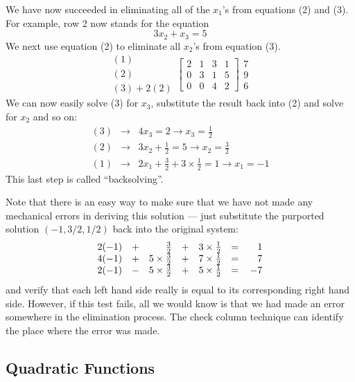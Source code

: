 \begin{example}
We have now succeeded in eliminating all of the $x_1$'s from equations
(2) and (3). For example, row 2 now stands for the equation
\[
3x_2+x_3=5
\]
We next use equation (2) to eliminate all $x_2$'s from equation
(3).
\[
\begin{array}{c} (1) \\ (2) \\ (3)+2(2) \end{array} 
\left[ \begin{array}{ccc|c} 2&1&3 & 1 \\  0&3&1&5 \\  0& 0&4 & 2 \end{array} \right]
\begin{array}{c} 7 \\ 9 \\ 6 \end{array} 
\]
We can now easily solve (3) for $x_3$, substitute the result back into (2) and
solve for $x_2$ and so on:
\begin{eqnarray*}
(3) &\rightarrow & 4x_3 =2  \rightarrow x_3 = \frac{1}{2} \\
(2) &\rightarrow & 3x_2 +\frac{1}{2} =5  \rightarrow x_2 = \frac{3}{2} \\
(1) &\rightarrow & 2x_1 + \frac{3}{2} + 3 \times \frac{1}{2} =1  \rightarrow x_1 = -1
\end{eqnarray*}
This last step is called ``backsolving''.
\end{example} 

Note that there is an easy way to make sure that we have not made any mechanical
errors in deriving this solution --- just substitute the purported solution
$(-1,3/2,1/2)$ back into the original system:
\[
\begin{array}{rrrrrrr}
  2(-1)&+& \frac{3}{2} &+&3 \times \frac{1}{2} &=\,&1 \\
  4(-1)&+&5\times \frac{3}{2}&+&7 \times \frac{1}{2}&=\,&7\cr
  2(-1)&-&5\times \frac{3}{2} &+&5 \times \frac{1}{2}&=\,&-7\cr
 \end{array} 
\]
and verify that each left hand side really is equal to its corresponding
right hand side. However, if this test fails, all we would know is that we had made an error somewhere in the elimination process. The check column technique can identify the place where the error was made. 

\subsection{Quadratic Functions}

